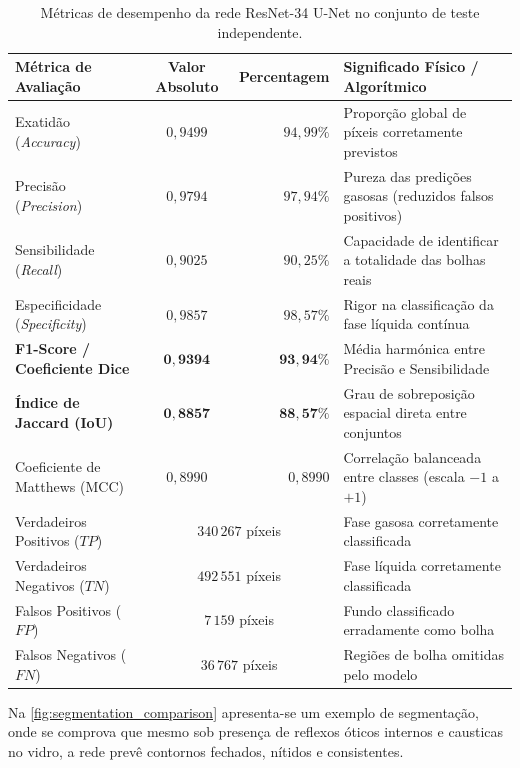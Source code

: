\begin{table}[!htbp]
\centering
\small
\caption{Métricas de desempenho da rede ResNet-34 U-Net no conjunto de teste independente.}
\label{tab:metricas_unet}
\begin{tabularx}{\textwidth}{lcr>{\raggedright\arraybackslash}X}
\toprule
\textbf{Métrica de Avaliação} & \textbf{Valor Absoluto} & \textbf{Percentagem} & \textbf{Significado Físico / Algorítmico} \\
\midrule
Exatidão (\emph{Accuracy}) & $0{,}9499$ & $94{,}99\%$ & Proporção global de píxeis corretamente previstos \\
Precisão (\emph{Precision}) & $0{,}9794$ & $97{,}94\%$ & Pureza das predições gasosas (reduzidos falsos positivos) \\
Sensibilidade (\emph{Recall}) & $0{,}9025$ & $90{,}25\%$ & Capacidade de identificar a totalidade das bolhas reais \\
Especificidade (\emph{Specificity}) & $0{,}9857$ & $98{,}57\%$ & Rigor na classificação da fase líquida contínua \\
\textbf{F1-Score / Coeficiente Dice} & $\mathbf{0{,}9394}$ & $\mathbf{93{,}94\%}$ & Média harmónica entre Precisão e Sensibilidade \\
\textbf{Índice de Jaccard (IoU)} & $\mathbf{0{,}8857}$ & $\mathbf{88{,}57\%}$ & Grau de sobreposição espacial direta entre conjuntos \\
Coeficiente de Matthews (MCC) & $0{,}8990$ & $0{,}8990$ & Correlação balanceada entre classes (escala $-1$ a $+1$) \\
\midrule
Verdadeiros Positivos ($TP$) & \multicolumn{2}{c}{$340\,267$ píxeis} & Fase gasosa corretamente classificada \\
Verdadeiros Negativos ($TN$) & \multicolumn{2}{c}{$492\,551$ píxeis} & Fase líquida corretamente classificada \\
Falsos Positivos ($FP$) & \multicolumn{2}{c}{$7\,159$ píxeis} & Fundo classificado erradamente como bolha \\
Falsos Negativos ($FN$) & \multicolumn{2}{c}{$36\,767$ píxeis} & Regiões de bolha omitidas pelo modelo \\
\bottomrule
\end{tabularx}
\end{table}

Na \autoref{fig:segmentation_comparison} apresenta-se um exemplo de segmentação, onde se comprova que mesmo sob presença de reflexos óticos internos e causticas no vidro, a rede prevê contornos fechados, nítidos e consistentes.


